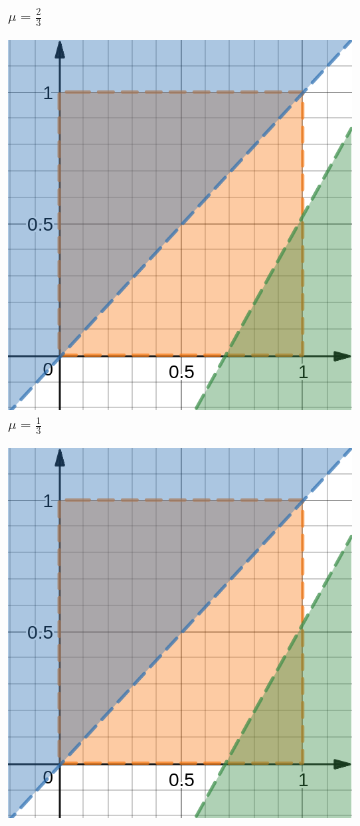 \begin{flushleft}
\begin{figure}[h]
\begin{subfigure}[b]{0.22 \textwidth}
        	\caption{$\mu=\frac{2}{3}$}
        	\label{fig:three sin x}
     	\end{subfigure}
     	\hfill
     	\begin{subfigure}[b]{0.22 \textwidth}
        	\centering
        	\includegraphics[width=\textwidth]{images/graf_6_3}
        	\caption{$\mu=\frac{1}{3}$}
        	\label{fig:five over x}
     	\end{subfigure}
     	\hfill
     	\begin{subfigure}[b]{0.22 \textwidth}
        	\centering
        	\includegraphics[width=\textwidth]{images/graf_6_3}

\end{subfigure}
\end{figure}
\end{flushleft}
